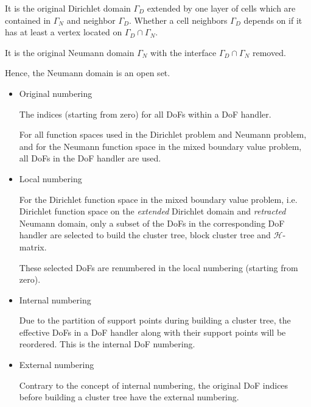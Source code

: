 \documentclass[11pt, a4paper]{article}
\begin{document}
\begin{Definition}
  It is the original Dirichlet domain $\Gamma_D$ extended by one layer of cells which
  are contained in $\Gamma_N$ and neighbor $\Gamma_D$. Whether a cell neighbors $\Gamma_D$
  depends on if it has at least a vertex located on $\Gamma_D \cap \Gamma_N$.
\end{Definition}

\begin{Definition}
  It is the original Neumann domain $\Gamma_{N}$ with the interface $\Gamma_D\cap\Gamma_N$
  removed.

  Hence, the Neumann domain is an open set.
\end{Definition}

\begin{itemize}
\item Original numbering

  The indices (starting from zero) for all DoFs within a DoF handler.
  
  For all function spaces used in the Dirichlet problem and Neumann problem, and for the
  Neumann function space in the mixed boundary value problem, all DoFs in the DoF handler
  are used.

\item Local numbering

  For the Dirichlet function space in the mixed boundary value problem, i.e. Dirichlet
  function space on the \emph{extended} Dirichlet domain and \emph{retracted} Neumann
  domain, only a subset of the DoFs in the corresponding DoF handler are selected to build
  the cluster tree, block cluster tree and $\mathcal{H}$-matrix.

  These selected DoFs are renumbered in the local numbering (starting from zero).
  
\item Internal numbering

  Due to the partition of support points during building a cluster tree, the effective
  DoFs in a DoF handler along with their support points will be reordered. This is the
  internal DoF numbering.
  
\item External numbering

  Contrary to the concept of internal numbering, the original DoF indices before building
  a cluster tree have the external numbering.


\end{itemize}
\end{document}
